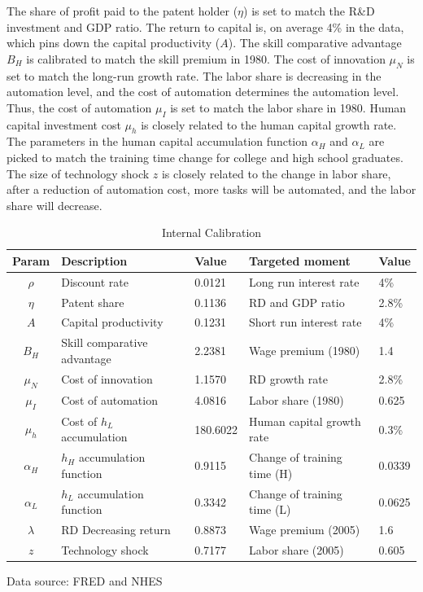 \documentclass[12pt]{article}
\begin{document}
The share of profit paid to the patent holder ($\eta$) is set to match the R\&D investment and GDP ratio. The return to capital is, on average 4\% in the data, which pins down the capital productivity ($A$). The skill comparative advantage $B_H$ is calibrated to match the skill premium in 1980. The cost of innovation $\mu_N$ is set to match the long-run growth rate. The labor share is decreasing in the automation level, and the cost of automation determines the automation level. Thus, the cost of automation $\mu_I$ is set to match the labor share in 1980. Human capital investment cost $\mu_h$ is closely related to the human capital growth rate. The parameters in the human capital accumulation function $\alpha_H$ and $\alpha_L$ are picked to match the training time change for college and high school graduates. The size of technology shock $z$ is closely related to the change in labor share, after a reduction of automation cost, more tasks will be automated, and the labor share will decrease. 

\begin{table}[h!]
\center
\begin{tabular}{cll|ll}
\hline \hline
Param & Description                      & Value & Targeted moment           & Value  \\ \hline
$\rho$    & Discount rate         &  0.0121    &  Long run interest rate & 4\%   \\
$\eta$    & Patent share                  &  0.1136    & RD and GDP ratio & 2.8\% \\
$A$       & Capital productivity               &     0.1231   & Short run interest rate      & 4\%   \\
$B_H$     & Skill comparative advantage  &  2.2381     & Wage premium (1980)      & 1.4    \\
$\mu_N$ & Cost of innovation   &   1.1570    & RD growth rate  & 2.8\%   \\
$\mu_I$ & Cost of automation   &  4.0816     & Labor share (1980)         & 0.625   \\
$\mu_h$ & Cost of $h_L$ accumulation   &   180.6022     & Human capital growth rate & 0.3\% \\
$\alpha_H$     & $h_H$ accumulation function   &   0.9115      & Change of training time  (H)  & 0.0339 \\
$\alpha_L$     &  $h_L$ accumulation function   &   0.3342  & Change of training time  (L) & 0.0625 \\
$\lambda$ & RD Decreasing return  &   	0.8873    & Wage premium (2005)   & 1.6 \\
$z$      & Technology shock       &    0.7177   &  Labor share (2005)        & 0.605    \\\hline
\end{tabular}
\caption{Internal Calibration}
\label{calibration2}
{\scriptsize Data source: FRED and NHES}
\end{table}
\end{document}
